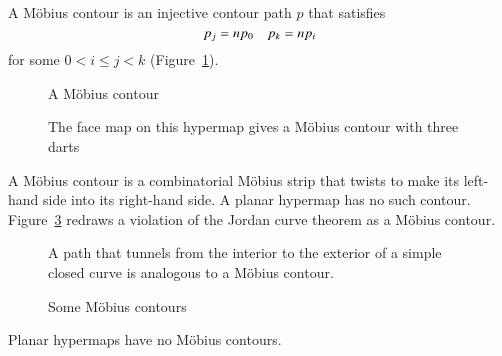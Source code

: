 \begin{definition} A M\"obius contour is an
injective contour path $p$ that satisfies
    \begin{equation}
    \tlabel{eqn:mobius}
    p_j = n p_0\quad p_k = n p_i
    \end{equation}
for some $0 < i\le j< k$ (Figure~\ref{fig:mobius}).
\end{definition}

\begin{figure}[htb]
  \centering
  \caption{A M\"obius contour}
  \label{fig:mobius}
\end{figure}

\begin{figure}[htb]
  \centering
  \caption{The face map on this hypermap gives a M\"obius contour with three darts}
  \label{fig:3m}
\end{figure}

\begin{remark} A M\"obius contour is a 
combinatorial M\"obius strip that
twists to make 
its left-hand side into
its right-hand side.  A planar hypermap has no such contour.  
Figure~\ref{fig:violate-jct}
redraws a violation of the Jordan curve theorem
as a M\"obius contour.   
\end{remark}

\begin{figure}[htb]
  \centering
  \caption{A path that tunnels from the interior to the exterior
   of a simple closed curve
   is analogous to a M\"obius contour.}
  \label{fig:violate-jct}
\end{figure}

\begin{figure}[htb]
  \centering
  \caption{Some M\"obius contours}
  \label{fig:mobius-contour}
\end{figure}






\begin{lemma}
Planar hypermaps have no M\"obius contours.
\end{lemma}

